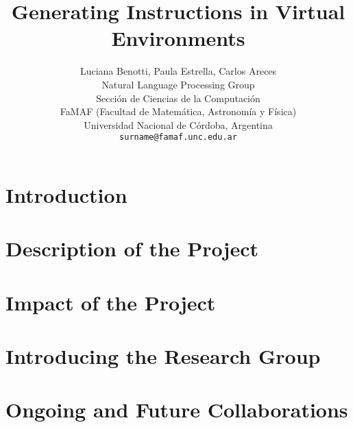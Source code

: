\documentclass[11pt,letterpaper]{article}
\title{Generating Instructions in Virtual Environments}
\author{Luciana Benotti, Paula Estrella, Carlos Areces \\
 Natural Language Processing Group \\
Secci\'on de Ciencias de la Computaci\'on \\
FaMAF (Facultad de Matem\'atica, Astronom\'ia y F\'isica) \\
Universidad Nacional de C\'ordoba, Argentina \\
  {\tt surname@famaf.unc.edu.ar}
}
\date{}
\begin{document}
\maketitle
\begin{abstract}
\end{abstract}

\section{Introduction}


\section{Description of the Project}


\section{Impact of the Project}


\section{Introducing the Research Group}


\section{Ongoing and Future Collaborations}





\end{document}
